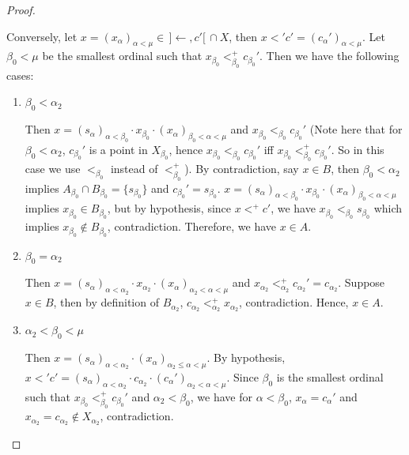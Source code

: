 \documentclass[12pt,oneside,english]{amsbook}
\numberwithin{equation}{section} %
\numberwithin{figure}{section} %
\theoremstyle{plain}
\numberwithin{section}{chapter}
\theoremstyle{plain}
\begin{document}
\begin{proof}
\begin{enumerate}
  Conversely, let $x  =  (x_{\alpha})_{\alpha < \mu} \in \, ] \leftarrow, c' [ \, \cap X$, then $x  <'  c'  =  (c_{\alpha}')_{\alpha < \mu}$. Let $\beta_{0} < \mu$ be the smallest ordinal such that $x_{\beta_{0}} <_{\beta_{0}}^+ c_{\beta_0}'$. Then we have the following cases:
  
    \begin{enumerate}
    \item $\beta_{0} < \alpha_{2}$
      
      Then $x  =  (s_{\alpha})_{\alpha < \beta_{0}} \cdot x_{\beta_{0}} \cdot (x_{\alpha})_{\beta_{0} < \alpha < \mu}$ and $x_{\beta_{0}} <_{\beta_0} c_{\beta_0}'$ (Note here that for $\beta_0 < \alpha_2$, $c_{\beta_0}'$ is a point in $X_{\beta_0}$, hence $x_{\beta_{0}} <_{\beta_0} c_{\beta_0}'$ iff $x_{\beta_{0}} <_{\beta_0}^+ c_{\beta_0}'$. So in this case we use $<_{\beta_0}$ instead of $<_{\beta_0}^+$). By contradiction, say $x  \in  B$, then $\beta_{0} < \alpha_{2} $ implies $A_{\beta_{0}} \cap B_{\beta_{0}}  =  \{s_{\beta_{0}} \}$ and $c_{\beta_{0}}'  =  s_{\beta_{0}}$. $x  =  (s_{\alpha})_{\alpha < \beta_{0}} \cdot x_{\beta_{0}} \cdot (x_{\alpha})_{\beta_{0} < \alpha < \mu}$ implies $x_{\beta_{0}}  \in  B_{\beta_{0}}$, but by hypothesis, since $x <^+ c' $, we have $x_{\beta_{0}} <_{\beta_0} s_{\beta_{0}}$ which implies $x_{\beta_{0}} \notin B_{\beta_{0}}$, contradiction. Therefore, we have $x \in A$.

    \item $\beta_{0}  =  \alpha_{2}$
      
      Then $x  =  (s_{\alpha})_{\alpha < \alpha_{2}} \cdot x_{\alpha_{2}} \cdot (x_{\alpha})_{\alpha_{2} < \alpha < \mu}$ and $x_{\alpha_{2}} <_{\alpha_2}^+ c_{\alpha_{2}}'  =  c_{\alpha_{2}}$. Suppose $x  \in  B$, then by definition of $B_{\alpha_{2}}$, $c_{\alpha_{2}} <_{\alpha_2}^+ x_{\alpha_{2}}$, contradiction. Hence, $x  \in  A$.

    \item $\alpha_{2} < \beta_{0} < \mu$
      
      Then $x  =  (s_{\alpha})_{\alpha < \alpha_{2}} \cdot (x_{\alpha})_{\alpha_{2} \leq \alpha < \mu}$. By hypothesis, $x <' c'  =  (s_{\alpha})_{\alpha < \alpha_{2}} \cdot c_{\alpha_{2}} \cdot (c_{\alpha}')_{\alpha_{2} < \alpha < \mu}$. Since $\beta_{0}$ is the smallest ordinal such that $x_{\beta_{0}} <_{\beta_{0}}^+ c_{\beta_{0}}'$ and $\alpha_{2} < \beta_{0}$, we have for $\alpha < \beta_{0}$, $x_{\alpha}  =  c_{\alpha}'$ and $x_{\alpha_{2}}  =  c_{\alpha_{2}}  \notin  X_{\alpha_{2}}$, contradiction. 
      \end{enumerate}


\end{enumerate}
\end{proof}
\end{document}
